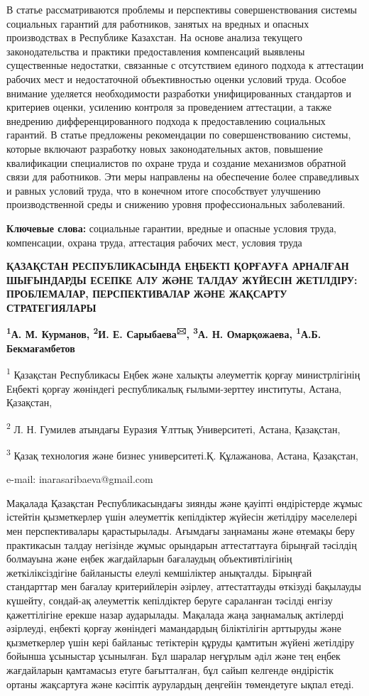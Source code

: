 В статье рассматриваются проблемы и перспективы совершенствования
системы социальных гарантий для работников, занятых на вредных и опасных
производствах в Республике Казахстан. На основе анализа текущего
законодательства и практики предоставления компенсаций выявлены
существенные недостатки, связанные с отсутствием единого подхода к
аттестации рабочих мест и недостаточной объективностью оценки условий
труда. Особое внимание уделяется необходимости разработки
унифицированных стандартов и критериев оценки, усилению контроля за
проведением аттестации, а также внедрению дифференцированного подхода к
предоставлению социальных гарантий. В статье предложены рекомендации по
совершенствованию системы, которые включают разработку новых
законодательных актов, повышение квалификации специалистов по охране
труда и создание механизмов обратной связи для работников. Эти меры
направлены на обеспечение более справедливых и равных условий труда, что
в конечном итоге способствует улучшению производственной среды и
снижению уровня профессиональных заболеваний.

{\bfseries Ключевые слова:} социальные гарантии, вредные и опасные условия
труда, компенсации, охрана труда, аттестация рабочих мест, условия труда

{\bfseries ҚАЗАҚСТАН РЕСПУБЛИКАСЫНДА ЕҢБЕКТІ ҚОРҒАУҒА АРНАЛҒАН ШЫҒЫНДАРДЫ
ЕСЕПКЕ АЛУ ЖӘНЕ ТАЛДАУ ЖҮЙЕСІН ЖЕТІЛДІРУ: ПРОБЛЕМАЛАР, ПЕРСПЕКТИВАЛАР
ЖӘНЕ ЖАҚСАРТУ СТРАТЕГИЯЛАРЫ}

{\bfseries \textsuperscript{1}А. М. Курманов, \textsuperscript{2}И. Е.
Сарыбаева\textsuperscript{🖂}, \textsuperscript{3}А. Н. Омарқожаева,
\textsuperscript{1}А.Б. Бекмағамбетов}

\textsuperscript{1} Қазақстан Республикасы Еңбек және халықты әлеуметтік
қорғау министрлігінің Еңбекті қорғау жөніндегі республикалық
ғылыми-зерттеу институты, Астана, Қазақстан,

\textsuperscript{2} Л. Н. Гумилев атындағы Еуразия Ұлттық Университеті,
Астана, Қазақстан,

\textsuperscript{3} Қазақ технология және бизнес университеті.Қ.
Құлажанова, Астана, Қазақстан,

e-mail: inarasaribaeva@gmail.com

Мақалада Қазақстан Республикасындағы зиянды және қауіпті өндірістерде
жұмыс істейтін қызметкерлер үшін әлеуметтік кепілдіктер жүйесін
жетілдіру мәселелері мен перспективалары қарастырылады. Ағымдағы
заңнаманы және өтемақы беру практикасын талдау негізінде жұмыс орындарын
аттестаттауға бірыңғай тәсілдің болмауына және еңбек жағдайларын
бағалаудың объективтілігінің жеткіліксіздігіне байланысты елеулі
кемшіліктер анықталды. Бірыңғай стандарттар мен бағалау критерийлерін
әзірлеу, аттестаттауды өткізуді бақылауды күшейту, сондай-ақ әлеуметтік
кепілдіктер беруге сараланған тәсілді енгізу қажеттілігіне ерекше назар
аударылады. Мақалада жаңа заңнамалық актілерді әзірлеуді, еңбекті қорғау
жөніндегі мамандардың біліктілігін арттыруды және қызметкерлер үшін кері
байланыс тетіктерін құруды қамтитын жүйені жетілдіру бойынша ұсыныстар
ұсынылған. Бұл шаралар неғұрлым әділ және тең еңбек жағдайларын
қамтамасыз етуге бағытталған, бұл сайып келгенде өндірістік ортаны
жақсартуға және кәсіптік аурулардың деңгейін төмендетуге ықпал етеді.

